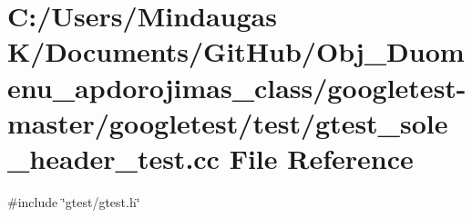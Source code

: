 \hypertarget{googletest-master_2googletest_2test_2gtest__sole__header__test_8cc}{}\section{C\+:/\+Users/\+Mindaugas K/\+Documents/\+Git\+Hub/\+Obj\+\_\+\+Duomenu\+\_\+apdorojimas\+\_\+class/googletest-\/master/googletest/test/gtest\+\_\+sole\+\_\+header\+\_\+test.cc File Reference}
\label{googletest-master_2googletest_2test_2gtest__sole__header__test_8cc}
{\ttfamily \#include \char`\"{}gtest/gtest.\+h\char`\"{}}\newline
